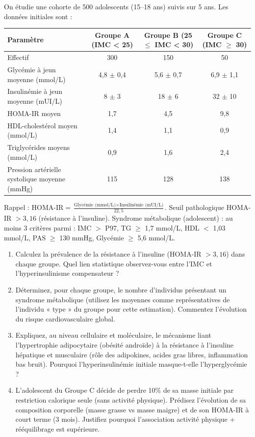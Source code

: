 \documentclass[11pt]{article}
\begin{document}
\begin{exercice}
On étudie une cohorte de 500 adolescents (15--18 ans) suivis sur 5 ans. Les données initiales sont :

\begin{center}
\begin{tabular}{l c c c}
\toprule
\textbf{Paramètre} & \textbf{Groupe A (IMC < 25)} & \textbf{Groupe B (25 $\le$ IMC < 30)} & \textbf{Groupe C (IMC $\ge$ 30)} \\
\midrule
Effectif & 300 & 150 & 50 \\
Glycémie à jeun moyenne (mmol/L) & 4,8 $\pm$ 0,4 & 5,6 $\pm$ 0,7 & 6,9 $\pm$ 1,1 \\
Insulinémie à jeun moyenne (mUI/L) & 8 $\pm$ 3 & 18 $\pm$ 6 & 32 $\pm$ 10 \\
HOMA-IR moyen & 1,7 & 4,5 & 9,8 \\
HDL-cholestérol moyen (mmol/L) & 1,4 & 1,1 & 0,9 \\
Triglycérides moyens (mmol/L) & 0,9 & 1,6 & 2,4 \\
Pression artérielle systolique moyenne (mmHg) & 115 & 128 & 138 \\
\bottomrule
\end{tabular}
\end{center}

\noindent Rappel : $\text{HOMA-IR} = \frac{\text{Glycémie (mmol/L)} \times \text{Insulinémie (mUI/L)}}{22,5}$. Seuil pathologique HOMA-IR $> 3,16$ (résistance à l'insuline). Syndrome métabolique (adolescent) : au moins 3 critères parmi : IMC $>$ P97, TG $\ge$ 1,7 mmol/L, HDL $<$ 1,03 mmol/L, PAS $\ge$ 130 mmHg, Glycémie $\ge$ 5,6 mmol/L.

\begin{enumerate}
    \item Calculez la prévalence de la résistance à l'insuline (HOMA-IR $> 3,16$) dans chaque groupe. Quel lien statistique observez-vous entre l'IMC et l'hyperinsulinisme compensateur ?
    \item Déterminez, pour chaque groupe, le nombre d'individus présentant un syndrome métabolique (utilisez les moyennes comme représentatives de l'individu « type » du groupe pour cette estimation). Commentez l'évolution du risque cardiovasculaire global.
    \item Expliquez, au niveau cellulaire et moléculaire, le mécanisme liant l'hypertrophie adipocytaire (obésité androïde) à la résistance à l'insuline hépatique et musculaire (rôle des adipokines, acides gras libres, inflammation bas bruit). Pourquoi l'hyperinsulinémie initiale masque-t-elle l'hyperglycémie ?
    \item L'adolescent du Groupe C décide de perdre 10\% de sa masse initiale par restriction calorique seule (sans activité physique). Prédisez l'évolution de sa composition corporelle (masse grasse vs masse maigre) et de son HOMA-IR à court terme (3 mois). Justifiez pourquoi l'association activité physique + rééquilibrage est supérieure.
\end{enumerate}
\end{exercice}
\end{document}
